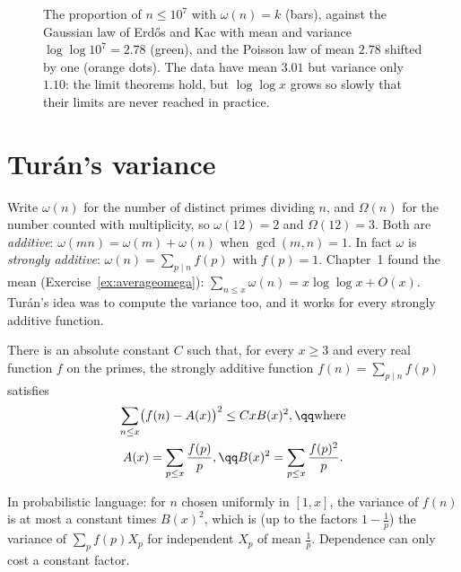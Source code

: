 \begin{figure}[ht]
\centering
{}
\caption{The proportion of $n\le10^7$ with $\omega(n)=k$ (bars), against the Gaussian law of Erd\H{o}s and Kac with mean and variance $\log\log10^7=2.78$ (green), and the Poisson
law of mean $2.78$ shifted by one (orange dots). The data have mean $3.01$ but variance only $1.10$: the limit theorems hold, but $\log\log x$ grows so slowly that their limits are
never reached in practice.}
\label{fig:omega}
\end{figure}

\section{Turán's variance}

Write $\omega(n)$ for the number of distinct primes dividing $n$, and $\Omega(n)$ for the number counted with multiplicity, so $\omega(12)=2$ and $\Omega(12)=3$. Both are \emph{additive}:
$\omega(mn)=\omega(m)+\omega(n)$ when $\gcd(m,n)=1$. In fact $\omega$ is \emph{strongly additive}: $\omega(n)=\sum_{p\mid n}f(p)$ with $f(p)=1$. Chapter~1 found the mean (Exercise~\ref{ex:averageomega}):
$\sum_{n\le x}\omega(n)=x\log\log x+O(x)$. Turán's idea was to compute the variance too, and it works for every strongly additive function.

\begin{theorem}\label{thm:tk}
There is an absolute constant $C$ such that, for every $x\ge3$ and every real function $f$ on the primes, the strongly additive function $f(n)=\sum_{p\mid n}f(p)$ satisfies
\[
\begin{gathered}\sum_{n\le x}\bigl(f(n)-A(x)\bigr)^2\le CxB(x)^2,\qq\text{where}\\A(x)=\sum_{p\le x}\frac{f(p)}p,\qq B(x)^2=\sum_{p\le x}\frac{f(p)^2}p.\end{gathered}
\]
\end{theorem}

In probabilistic language: for $n$ chosen uniformly in $[1,x]$, the variance of $f(n)$ is at most a constant times $B(x)^2$, which is (up to the factors $1-\frac1p$) the variance of
$\sum_pf(p)X_p$ for independent $X_p$ of mean $\frac1p$. Dependence can only cost a constant factor.

